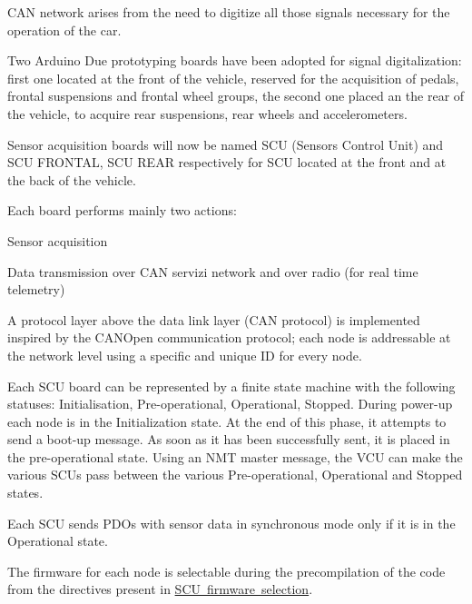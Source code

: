 C\+AN network arises from the need to digitize all those signals necessary for the operation of the car.

Two Arduino Due prototyping boards have been adopted for signal digitalization\+: first one located at the front of the vehicle, reserved for the acquisition of pedals, frontal suspensions and frontal wheel groups, the second one placed an the rear of the vehicle, to acquire rear suspensions, rear wheels and accelerometers.

Sensor acquisition boards will now be named S\+CU (Sensors Control Unit) and S\+CU F\+R\+O\+N\+T\+AL, S\+CU R\+E\+AR respectively for S\+CU located at the front and at the back of the vehicle.

Each board performs mainly two actions\+:
\begin{DoxyItemize}
\item Sensor acquisition
\item Data transmission over C\+AN servizi network and over radio (for real time telemetry)
\end{DoxyItemize}

A protocol layer above the data link layer (C\+AN protocol) is implemented inspired by the C\+A\+N\+Open communication protocol; each node is addressable at the network level using a specific and unique ID for every node.

Each S\+CU board can be represented by a finite state machine with the following statuses\+: Initialisation, Pre-\/operational, Operational, Stopped. During power-\/up each node is in the Initialization state. At the end of this phase, it attempts to send a boot-\/up message. As soon as it has been successfully sent, it is placed in the pre-\/operational state. Using an N\+MT master message, the V\+CU can make the various S\+C\+Us pass between the various Pre-\/operational, Operational and Stopped states.

Each S\+CU sends P\+D\+Os with sensor data in synchronous mode only if it is in the Operational state.

The firmware for each node is selectable during the precompilation of the code from the directives present in \mbox{\hyperlink{group___s_c_u__firmware__selection}{S\+CU firmware selection}}. 